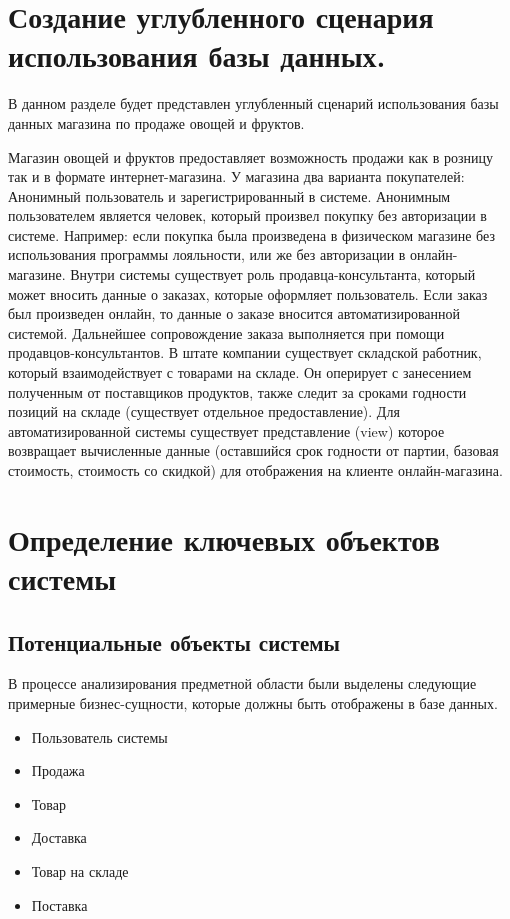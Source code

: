 \documentclass[14pt]{extreport}
\begin{document}
\pagestyle{empty} %


\pagestyle{plain} %

\chapter{Создание углубленного сценария использования базы данных.}

В данном разделе будет представлен углубленный сценарий использования базы данных магазина по продаже овощей и фруктов.


Магазин овощей и фруктов предоставляет возможность продажи как в розницу так и в формате интернет-магазина. У магазина два варианта покупателей: Анонимный пользователь и зарегистрированный в системе. Анонимным пользователем является человек, который произвел покупку без авторизации в системе. Например: если покупка была произведена в физическом магазине без использования программы лояльности, или же без авторизации в онлайн-магазине. Внутри системы существует роль продавца-консультанта, который может вносить данные о заказах, которые оформляет пользователь. Если заказ был произведен онлайн, то данные о заказе вносится автоматизированной системой. Дальнейшее сопровождение заказа выполняется при помощи продавцов-консультантов. В штате компании существует складской работник, который взаимодействует с товарами на складе. Он оперирует с занесением полученным от поставщиков продуктов, также следит за сроками годности позиций на складе (существует отдельное предоставление). Для автоматизированной системы существует представление (view) которое возвращает вычисленные данные (оставшийся срок годности от партии, базовая стоимость, стоимость со скидкой) для отображения на клиенте онлайн-магазина.

\chapter{Определение ключевых объектов системы}

    \section{Потенциальные объекты системы}
        В процессе анализирования предметной области были выделены следующие примерные бизнес-сущности, которые должны быть отображены в базе данных.

        \begin{itemize}
            \item Пользователь системы
            \item Продажа
            \item Товар
            \item Доставка
            \item Товар на складе
            \item Поставка
        \end{itemize}
    
\end{document}
